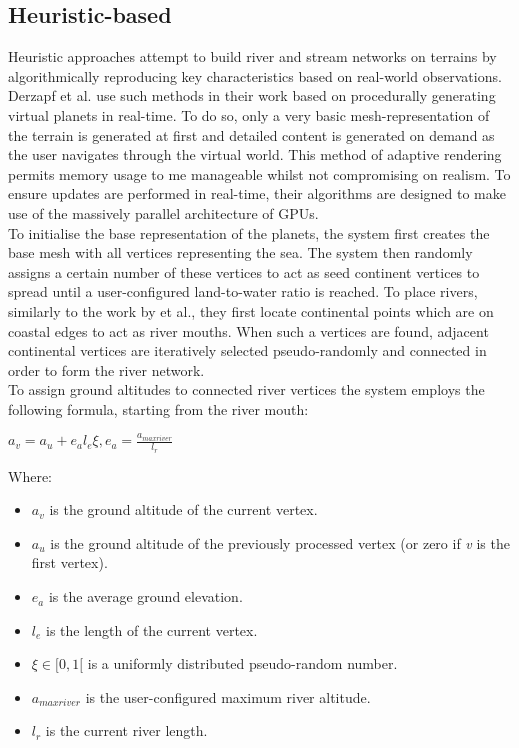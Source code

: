 \subsection{Heuristic-based}

Heuristic approaches attempt to build river and stream networks on terrains by algorithmically reproducing key characteristics based on real-world observations. \\

Derzapf et al. \cite{Derzapf2011} use such methods in their work based on procedurally generating virtual planets in real-time. To do so, only a very basic mesh-representation of the terrain is generated at first and detailed content is generated on demand as the user navigates through the virtual world. This method of adaptive rendering permits memory usage to me manageable whilst not compromising on realism. To ensure updates are performed in real-time, their algorithms are designed to make use of the massively parallel architecture of GPUs. \\
To initialise the base representation of the planets, the system first creates the base mesh with all vertices representing the sea. The system then randomly assigns a certain number of these vertices to act as seed continent vertices to spread until a user-configured land-to-water ratio is reached.
To place rivers, similarly to the work by \cite{Genevaux2013} et al., they first locate continental points which are on coastal edges to act as river mouths. When such a vertices are found, adjacent continental vertices are iteratively selected pseudo-randomly and connected in order to form the river network. \\
To assign ground altitudes to connected river vertices the system employs the following formula, starting from the river mouth:

\begin{center}
$a_{v} = a_{u} + e_{a}l_{e}\xi , e_{a} = \frac{a_{maxriver}}{l_{r}} $ \\
\end{center}

Where:
\begin{itemize}
\item $a_{v}$ is the ground altitude of the current vertex.
\item $a_{u}$ is the ground altitude of the previously processed vertex (or zero if \textit{v} is the first vertex).
\item $e_{a}$ is the average ground elevation.
\item $l_{e}$ is the length of the current vertex.
\item $\xi \in [0,1[$ is a uniformly distributed pseudo-random number.
\item $a_{maxriver}$ is the user-configured maximum river altitude.
\item $l_{r}$ is the current river length.
\end{itemize}

